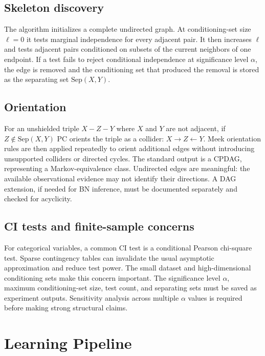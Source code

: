 \documentclass[10pt,twocolumn,letterpaper]{article}
\begin{document}
	\subsection{Skeleton discovery}
	The algorithm initializes a complete undirected graph. At conditioning-set size \(\ell = 0\) it tests marginal independence for every adjacent pair. It then increases \(\ell\) and tests adjacent pairs conditioned on subsets of the current neighbors of one endpoint. If a test fails to reject conditional independence at significance level \(\alpha\), the edge is removed and the conditioning set that produced the removal is stored as the separating set \(\mathrm{Sep}(X,Y)\).

	\subsection{Orientation}
	For an unshielded triple \(X - Z - Y\) where \(X\) and \(Y\) are not adjacent, if \(Z\notin \mathrm{Sep}(X,Y)\) PC orients the triple as a collider: \(X\rightarrow Z\gets Y\). Meek orientation rules are then applied repeatedly to orient additional edges without introducing unsupported colliders or directed cycles. The standard output is a CPDAG, representing a Markov-equivalence class. Undirected edges are meaningful: the available observational evidence may not identify their directions. A DAG extension, if needed for BN inference, must be documented separately and checked for acyclicity.

	\subsection{CI tests and finite-sample concerns}
	For categorical variables, a common CI test is a conditional Pearson chi-square test. Sparse contingency tables can invalidate the usual asymptotic approximation and reduce test power. The small dataset and high-dimensional conditioning sets make this concern important. The significance level \(\alpha\), maximum conditioning-set size, test count, and separating sets must be saved as experiment outputs. Sensitivity analysis across multiple \(\alpha\) values is required before making strong structural claims.

	\section{Learning Pipeline}
\end{document}
